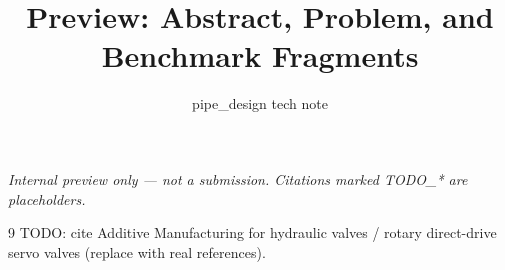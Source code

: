 \documentclass[11pt]{article}
\title{Preview: Abstract, Problem, and Benchmark Fragments}
\author{pipe\_design tech note}
\date{}
\begin{document}
\maketitle
\noindent\textit{Internal preview only --- not a submission.
Citations marked TODO\_* are placeholders.}





\begin{thebibliography}{9}
TODO: cite Additive Manufacturing for hydraulic valves / rotary direct-drive
servo valves (replace with real references).
\end{thebibliography}

\appendix

\end{document}
